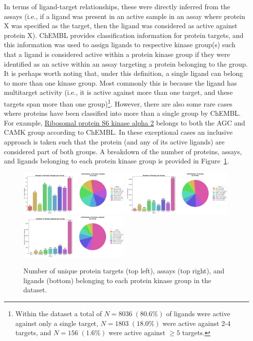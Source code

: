 \documentclass[11pt]{article}
\begin{document}
In terms of ligand-target relationships, these were directly inferred from the assays (i.e., if a ligand was present in an active sample in an assay where protein X was specified as the target, then the ligand was considered as active against protein X). 
ChEMBL provides classification information for protein targets, and this information was used to assign ligands to respective kinase group(s) such that a ligand is considered active within a protein kinase group if they were identified as an active within an assay targeting a protein belonging to the group. 
It is perhaps worth noting that, under this definition, a single ligand can belong to more than one kinase group. 
Most commonly this is because the ligand has multitarget activity (i.e., it is active against more than one target, and these targets span more than one group)\footnote{Within the dataset a total of $N=8036 \; (80.6\%)$ of ligands were active against only a single target, $N=1803 \; (18.0\%)$ were active against 2-4 targets, and $N=156 \; (1.6\%)$ were active against $\geq 5$ targets.}. 
However, there are also some rare cases where proteins have been classified into more than a single group by ChEMBL. 
For example, \href{https://www.ebi.ac.uk/chembl/explore/target/CHEMBL3906}{Ribosomal protein S6 kinase alpha 2} belongs to both the AGC and CAMK group according to ChEMBL. 
In these exceptional cases an inclusive approach is taken such that the protein (and any of its active ligands) are considered part of both groups.  
A breakdown of the number of proteins, assays, and ligands belonging to each protein kinase group is provided in Figure~\ref{fig:group_atl_counts}. 


\begin{figure}[H]
    \centering 
    \includegraphics[width=0.49\textwidth]{../figures/ntarget_by_group.png}
    \includegraphics[width=0.49\textwidth]{../figures/nassay_by_group.png}
    \includegraphics[width=0.49\textwidth]{../figures/nligand_by_group.png}
    \caption{Number of unique protein targets (top left), assays (top right), and ligands (bottom) belonging to each protein kinase group in the dataset.}
    \label{fig:group_atl_counts}
\end{figure}
\end{document}
